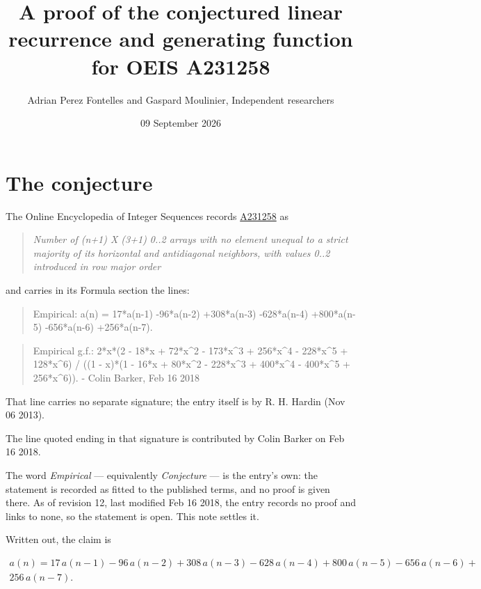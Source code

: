 \documentclass[11pt]{article}
\title{A proof of the conjectured linear recurrence and generating function for OEIS A231258}
\author{Adrian Perez Fontelles and Gaspard Moulinier, Independent researchers}
\date{09 September 2026}
\theoremstyle{definition}
\begin{document}
\maketitle
\section{The conjecture}

The Online Encyclopedia of Integer Sequences records \href{https://oeis.org/A231258}{A231258} as

\begin{quote}\itshape Number of (n+1) X (3+1) 0..2 arrays with no element unequal to a strict majority of its horizontal and antidiagonal neighbors, with values 0..2 introduced in row major order\end{quote}

and carries in its Formula section the lines:

\begin{quote}\ttfamily Empirical: a(n) = 17*a(n-1) -96*a(n-2) +308*a(n-3) -628*a(n-4) +800*a(n-5) -656*a(n-6) +256*a(n-7).\end{quote}

\begin{quote}\ttfamily Empirical g.f.: 2*x*(2 - 18*x + 72*x\textasciicircum{}2 - 173*x\textasciicircum{}3 + 256*x\textasciicircum{}4 - 228*x\textasciicircum{}5 + 128*x\textasciicircum{}6) / ((1 - x)*(1 - 16*x + 80*x\textasciicircum{}2 - 228*x\textasciicircum{}3 + 400*x\textasciicircum{}4 - 400*x\textasciicircum{}5 + 256*x\textasciicircum{}6)). - Colin Barker, Feb 16 2018\end{quote}

That line carries no separate signature; the entry itself is by R. H. Hardin (Nov 06 2013).

The line quoted ending in that signature is contributed by Colin Barker on Feb 16 2018.

The word {\itshape Empirical} --- equivalently {\itshape Conjecture} --- is the entry's own: the statement is recorded as fitted to the published terms, and no proof is given there. As of revision 12, last modified Feb 16 2018, the entry records no proof and links to none, so the statement is open. This note settles it.

Written out, the claim is

\begin{multline*} a(n) = 17\,a(n-1) - 96\,a(n-2) + 308\,a(n-3) - 628\,a(n-4) + 800\,a(n-5) - 656\,a(n-6) + \\ 256\,a(n-7). \end{multline*}
\end{document}
